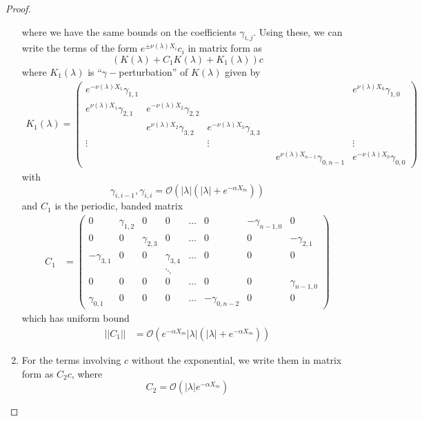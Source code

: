 \documentclass[thesis.tex]{subfiles}
\begin{document}
\begin{lemma}
\begin{proof}
\begin{enumerate}
where we have the same bounds on the coefficients $\gamma_{i,j}$. Using these, we can write the terms of the form $e^{\pm \nu(\lambda) X_i} c_i$ in matrix form as
\[
(K(\lambda) + C_1 K(\lambda) + K_1(\lambda)) c
\]
where $K_1(\lambda)$ is ``$\gamma-$perturbation'' of $K(\lambda)$ given by
\begin{align*}
K_1(\lambda) =  
\begin{pmatrix}
e^{-\nu(\lambda)X_1} \gamma_{1,1} & & & & & e^{\nu(\lambda)X_0}\gamma_{1,0} \\
e^{\nu(\lambda)X_1}\gamma_{2,1} & e^{-\nu(\lambda)X_2}\gamma_{2,2} \\
& e^{\nu(\lambda)X_2}\gamma_{3,2} & e^{-\nu(\lambda)X_3}\gamma_{3,3} \\
\vdots & & \vdots & &&  \vdots \\
& & & & e^{\nu(\lambda)X_{n-1}}\gamma_{0,n-1} & e^{-\nu(\lambda)X_0}\gamma_{0,0} 
\end{pmatrix}
\end{align*}
with 
\[
\gamma_{i,i-1}, \gamma_{i,i} = \mathcal{O}(|\lambda|(|\lambda| + e^{-\alpha X_m}))
\] 
and $C_1$ is the periodic, banded matrix
\begin{align*}
C_1 &= \begin{pmatrix}
0 & \gamma_{1,2} & 0 & 0 & \dots & 0 & -\gamma_{n-1,0} & 0 \\
0 & 0 & \gamma_{2,3} & 0 & \dots & 0 & 0 & -\gamma_{2,1} \\
-\gamma_{3,1} & 0 & 0 & \gamma_{3,4} & \dots & 0 & 0 & 0 \\
&  & & \ddots  \\
0 & 0 & 0 & 0 & \dots & 0 & 0 & \gamma_{n-1,0} \\
\gamma_{0,1} & 0 & 0 & 0 & \dots & -\gamma_{0, n-2} & 0 & 0 
\end{pmatrix}
\end{align*}
which has uniform bound
\begin{align*}
||C_1|| &= 
\mathcal{O}(e^{-\alpha X_m}|\lambda|(|\lambda| + e^{-\alpha X_m}))
\end{align*}

\item For the terms involving $c$ without the exponential, we write them in matrix form as $C_2 c$, where
\[
C_2 = \mathcal{O}(|\lambda|e^{-\alpha X_m})
\]


\end{enumerate}
\end{proof}
\end{lemma}
\end{document}
